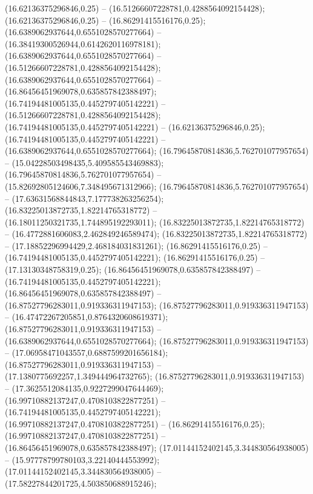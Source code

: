  (16.62136375296846,0.25) -- (16.51266607228781,0.4288564092154428);
 (16.62136375296846,0.25) -- (16.86291415516176,0.25);
 (16.6389062937644,0.6551028570277664) -- (16.38419300526944,0.6142620116978181);
 (16.6389062937644,0.6551028570277664) -- (16.51266607228781,0.4288564092154428);
 (16.6389062937644,0.6551028570277664) -- (16.86456451969078,0.635857842388497);
 (16.74194481005135,0.4452797405142221) -- (16.51266607228781,0.4288564092154428);
 (16.74194481005135,0.4452797405142221) -- (16.62136375296846,0.25);
 (16.74194481005135,0.4452797405142221) -- (16.6389062937644,0.6551028570277664);
 (16.79645870814836,5.762701077957654) -- (15.04228503498435,5.409585543469883);
 (16.79645870814836,5.762701077957654) -- (15.82692805124606,7.348495671312966);
 (16.79645870814836,5.762701077957654) -- (17.63631568844843,7.177738263256254);
 (16.83225013872735,1.82214765318772) -- (16.18011250321735,1.744895192293011);
 (16.83225013872735,1.82214765318772) -- (16.4772881606083,2.462849246589474);
 (16.83225013872735,1.82214765318772) -- (17.18852296994429,2.468184031831261);
 (16.86291415516176,0.25) -- (16.74194481005135,0.4452797405142221);
 (16.86291415516176,0.25) -- (17.13130348758319,0.25);
 (16.86456451969078,0.635857842388497) -- (16.74194481005135,0.4452797405142221);
 (16.86456451969078,0.635857842388497) -- (16.87527796283011,0.919336311947153);
 (16.87527796283011,0.919336311947153) -- (16.47472267205851,0.8764320608619371);
 (16.87527796283011,0.919336311947153) -- (16.6389062937644,0.6551028570277664);
 (16.87527796283011,0.919336311947153) -- (17.06958471043557,0.6887599201656184);
 (16.87527796283011,0.919336311947153) -- (17.1380775692257,1.349444964732765);
 (16.87527796283011,0.919336311947153) -- (17.3625512084135,0.9227299047644469);
 (16.99710882137247,0.4708103822877251) -- (16.74194481005135,0.4452797405142221);
 (16.99710882137247,0.4708103822877251) -- (16.86291415516176,0.25);
 (16.99710882137247,0.4708103822877251) -- (16.86456451969078,0.635857842388497);
 (17.01144152402145,3.344830564938005) -- (15.97778799780103,3.22140444553992);
 (17.01144152402145,3.344830564938005) -- (17.58227844201725,4.503850688915246);
